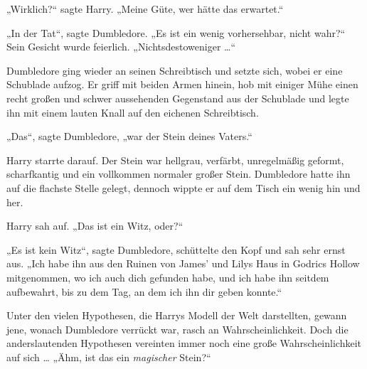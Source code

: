 „Wirklich?“ sagte Harry.
„Meine Güte, wer hätte das erwartet.“

„In der Tat“, sagte Dumbledore.
„Es ist ein wenig vorhersehbar, nicht wahr?“ Sein Gesicht wurde feierlich.
„Nichtsdestoweniger …“

Dumbledore ging wieder an seinen Schreibtisch und setzte sich, wobei er eine Schublade aufzog. Er griff mit beiden Armen hinein, hob mit einiger Mühe einen recht großen und schwer aussehenden Gegenstand aus der Schublade und legte ihn mit einem lauten Knall auf den eichenen Schreibtisch.

„Das“, sagte Dumbledore, „war der Stein deines Vaters.“

Harry starrte darauf. Der Stein war hellgrau, verfärbt, unregelmäßig geformt, scharfkantig und ein vollkommen normaler großer Stein. Dumbledore hatte ihn auf die flachste Stelle gelegt, dennoch wippte er auf dem Tisch ein wenig hin und her.

Harry sah auf.
„Das ist ein Witz, oder?“

„Es ist kein Witz“, sagte Dumbledore, schüttelte den Kopf und sah sehr ernst aus.
„Ich habe ihn aus den Ruinen von James’ und Lilys Haus in Godrics Hollow mitgenommen, wo ich auch dich gefunden habe, und ich habe ihn seitdem aufbewahrt, bis zu dem Tag, an dem ich ihn dir geben konnte.“

Unter den vielen Hypothesen, die Harrys Modell der Welt darstellten, gewann jene, wonach Dumbledore verrückt war, rasch an Wahrscheinlichkeit. Doch die anderslautenden Hypothesen vereinten immer noch eine große Wahrscheinlichkeit auf sich … „Ähm, ist das ein \emph{magischer} Stein?“

